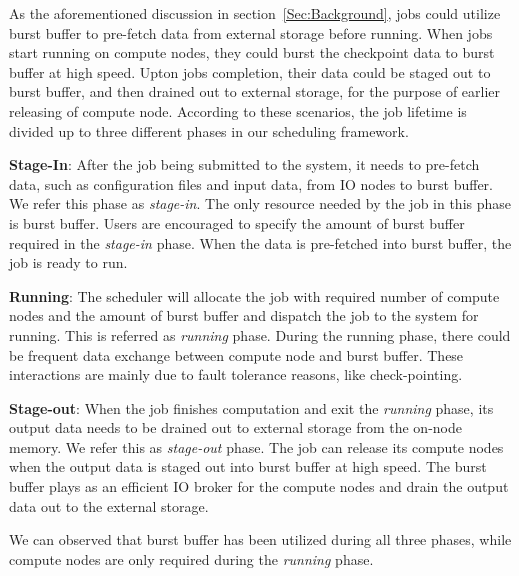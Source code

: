 As the aforementioned discussion in section~\ref{Sec:Background},
jobs could utilize burst buffer to pre-fetch data from external storage before running.
When jobs start running on compute nodes,
they could burst the checkpoint data to burst buffer at high speed.
Upton jobs completion, their data could be staged out to burst buffer,
and then drained out to external storage, for the purpose of earlier releasing of compute node.
According to these scenarios,
the job lifetime is divided up to three different phases in our scheduling framework.

\textbf{Stage-In}: After the job being submitted to the system,
         it needs to pre-fetch data, such as configuration files and input data,
         from IO nodes to burst buffer. We refer this phase as \textit{stage-in}.
         The only resource needed by the job in this phase is burst buffer.
         Users are encouraged to specify the amount of burst buffer required in the \textit{stage-in} phase.
         When the data is pre-fetched into burst buffer, the job is ready to run.
 
\textbf{Running}: The scheduler will allocate the job with required
         number of compute nodes and the amount of burst buffer and
         dispatch the job to the system for running.
         This is referred as \textit{running} phase.
         During the running phase, there could be frequent data exchange
         between compute node and burst buffer.
         These interactions are mainly due to fault tolerance reasons, like check-pointing. 
 
\textbf{Stage-out}: When the job finishes computation and
         exit the \textit{running} phase, its output data needs to be drained out
         to external storage from the on-node memory. We refer this as \textit{stage-out} phase.
         The job can release its compute nodes when the output data is staged out
         into burst buffer at high speed. The burst buffer plays as an efficient
         IO broker for the compute nodes and drain the output data out to the external storage.

We can observed that burst buffer has been utilized during all three phases,
while compute nodes are only required during the \textit{running} phase. 


